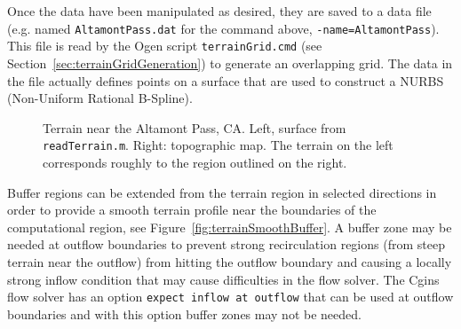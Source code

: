 \documentclass[11pt]{article}
\begin{document}
Once the data have been manipulated as
desired, they are saved to a data file (e.g. named {\tt AltamontPass.dat} for the command above, {\tt -name=AltamontPass}). 
This file is read by the Ogen script {\tt terrainGrid.cmd} (see Section~\ref{sec:terrainGridGeneration})
to generate an overlapping grid. The data in the file actually defines points on a surface that
are used to construct a NURBS (Non-Uniform Rational B-Spline).





{%
\newcommand{\figWidtha}{11.cm}
\newcommand{\trimfiga}[2]{\trimPlot{#1}{#2}{.0}{.0}{.0}{.0}}
\newcommand{\figWidthb}{7.cm}
\newcommand{\trimfigb}[2]{\trimPlot{#1}{#2}{.15}{.175}{.4}{.3}}
% 
\begin{figure}[hbt]
\begin{center}
\end{center}
 \caption{Terrain near the Altamont Pass, CA. Left, surface from {\tt readTerrain.m}. Right: topographic map. The terrain
   on the left corresponds roughly to the region outlined on the right.}
  \label{fig:AltamontPass}
\end{figure}
%
}%

Buffer regions can be extended from the terrain region in selected directions in order to provide a smooth terrain profile near the
boundaries of the computational region, see Figure~\ref{fig:terrainSmoothBuffer}. 
A buffer zone may be needed at outflow boundaries to prevent strong
recirculation regions (from steep terrain near the outflow) from hitting the outflow boundary and 
causing a locally strong inflow condition that may cause difficulties in the flow solver. The Cgins flow solver
has an option {\tt expect inflow at outflow} that can be used at outflow boundaries and with this option buffer
zones may not be needed. 
\end{document}
